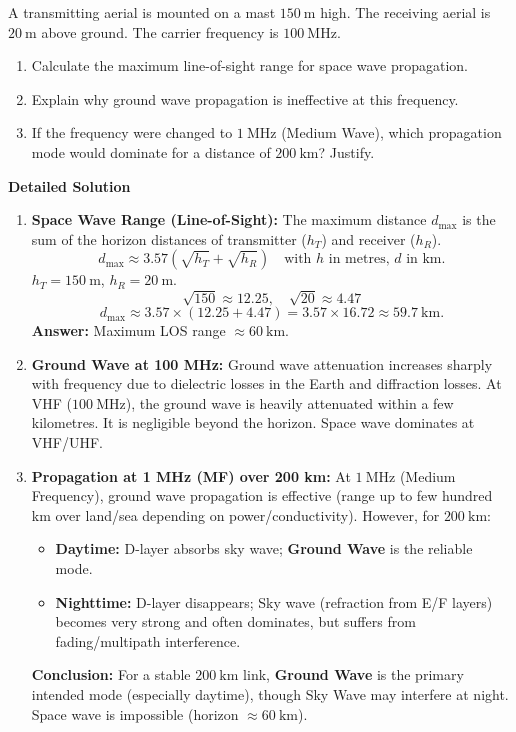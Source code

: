 \documentclass[11pt]{article}
\begin{document}
\begin{exoresolu}
A transmitting aerial is mounted on a mast $150\ \mathrm{m}$ high. The receiving aerial is $20\ \mathrm{m}$ above ground. The carrier frequency is $100\ \mathrm{MHz}$.
\begin{enumerate}
\item Calculate the maximum line-of-sight range for space wave propagation.
\item Explain why ground wave propagation is ineffective at this frequency.
\item If the frequency were changed to $1\ \mathrm{MHz}$ (Medium Wave), which propagation mode would dominate for a distance of $200\ \mathrm{km}$? Justify.
\end{enumerate}
\tcblower
\textbf{Detailed Solution}
\begin{enumerate}
\item \textbf{Space Wave Range (Line-of-Sight):}
The maximum distance $d_{\max}$ is the sum of the horizon distances of transmitter ($h_T$) and receiver ($h_R$).
\[
d_{\max} \approx 3.57 \left( \sqrt{h_T} + \sqrt{h_R} \right) \quad \text{with } h \text{ in metres, } d \text{ in km}.
\]
$h_T = 150\ \mathrm{m}$, $h_R = 20\ \mathrm{m}$.
\[
\sqrt{150} \approx 12.25,\quad \sqrt{20} \approx 4.47
\]
\[
d_{\max} \approx 3.57 \times (12.25 + 4.47) = 3.57 \times 16.72 \approx 59.7\ \mathrm{km}.
\]
\textbf{Answer:} Maximum LOS range $\approx 60\ \mathrm{km}$.

\item \textbf{Ground Wave at 100 MHz:}
Ground wave attenuation increases sharply with frequency due to dielectric losses in the Earth and diffraction losses. At VHF ($100\ \mathrm{MHz}$), the ground wave is heavily attenuated within a few kilometres. It is negligible beyond the horizon. Space wave dominates at VHF/UHF.

\item \textbf{Propagation at 1 MHz (MF) over 200 km:}
At $1\ \mathrm{MHz}$ (Medium Frequency), ground wave propagation is effective (range up to few hundred km over land/sea depending on power/conductivity). However, for $200\ \mathrm{km}$:
\begin{itemize}
\item \textbf{Daytime:} D-layer absorbs sky wave; \textbf{Ground Wave} is the reliable mode.
\item \textbf{Nighttime:} D-layer disappears; Sky wave (refraction from E/F layers) becomes very strong and often dominates, but suffers from fading/multipath interference.
\end{itemize}
\textbf{Conclusion:} For a stable $200\ \mathrm{km}$ link, \textbf{Ground Wave} is the primary intended mode (especially daytime), though Sky Wave may interfere at night. Space wave is impossible (horizon $\approx 60\ \mathrm{km}$).
\end{enumerate}
\end{exoresolu}
\end{document}
